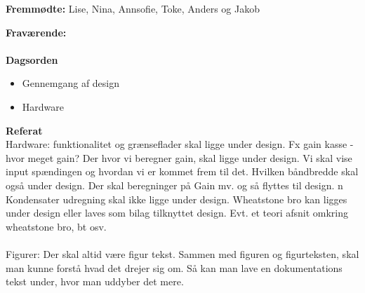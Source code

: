 \textbf{Fremmødte:} Lise, Nina, Annsofie, Toke, Anders og Jakob

\textbf{Fraværende:} 
\\
\\
\textbf{Dagsorden}
\begin{itemize}
	\item Gennemgang af design
	\item Hardware
\end{itemize}

\textbf{Referat}
\\
Hardware: funktionalitet og grænseflader skal ligge under design. Fx gain kasse - hvor meget gain? Der hvor vi beregner gain, skal ligge under design. Vi skal vise input spændingen og hvordan vi er kommet frem til det. Hvilken båndbredde skal også under design. Der skal beregninger på Gain mv. og så flyttes til design. n
Kondensater udregning skal ikke ligge under design.
Wheatstone bro kan ligges under design eller laves som bilag tilknyttet design. 
Evt. et teori afsnit omkring wheatstone bro, bt osv.
\\
\\
Figurer: Der skal altid være figur tekst. Sammen med figuren og figurteksten, skal man kunne forstå hvad det drejer sig om. Så kan man lave en dokumentations tekst under, hvor man uddyber det mere. 